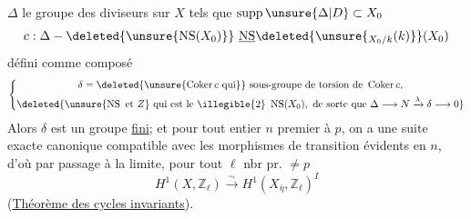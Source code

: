 $\Delta$ le groupe des diviseurs sur $X$ tels que $\operatorname{supp}\unsure{\Delta|D}\subset X_0$
\[
c:\Delta\mathbin{-}\deleted{\unsure{\operatorname{NS}(X_0)}}\ \underline{\operatorname{NS}}\deleted{\unsure{{}_{X_0/k}(k)}}(X_0)
\]
défini comme composé
\[
\left\{\begin{gathered}
\delta=\deleted{\unsure{\operatorname{Coker}c\text{ qui}}}\ \text{sous-groupe de torsion de }\operatorname{Coker}c,\\
\deleted{\unsure{\operatorname{NS}\text{ et }Z}\ \text{qui est le}\ \illegible{2}\ \operatorname{NS}(X_0),\ \text{de sorte que }\Delta\longrightarrow N\xrightarrow{\lambda}\delta\longrightarrow0}
\end{gathered}\right.
\]
 Alors $\delta$ est un groupe \uline{fini};  et pour tout entier $n$ premier à $p$, on a une suite exacte canonique
compatible avec les morphismes de transition évidents en $n$, d'où par passage à la limite, pour tout $\ell$ nbr pr. $\neq p$
\[
H^1(X,\mathbb Z_\ell)\xrightarrow{\sim}H^1(X_{\bar\eta},\mathbb Z_\ell)^I
\]
(\uline{Théorème des cycles invariants}).

